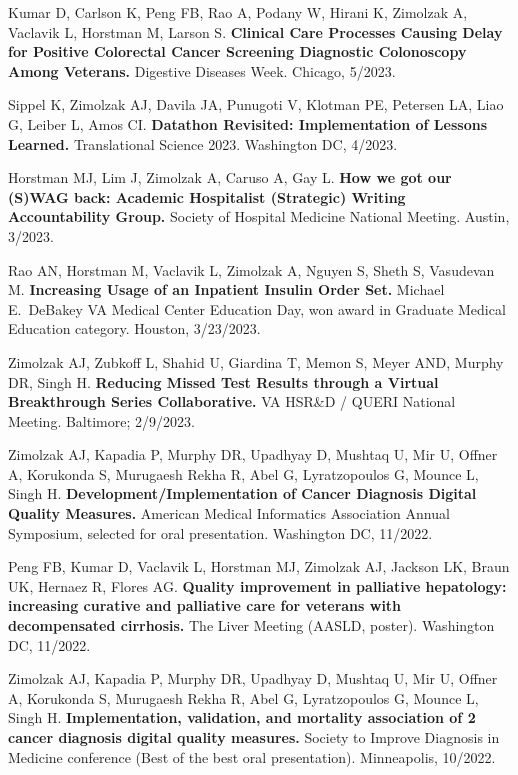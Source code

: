 \documentclass[10pt]{article}
\begin{document}
Kumar D, Carlson K, Peng FB, Rao A, Podany W, Hirani K, Zimolzak A,
Vaclavik L, Horstman M, Larson S. \textbf{Clinical Care Processes
  Causing Delay for Positive Colorectal Cancer Screening Diagnostic
  Colonoscopy Among Veterans.} Digestive Diseases Week. Chicago,
5/2023.

Sippel K, Zimolzak AJ, Davila JA, Punugoti V, Klotman PE, Petersen LA,
Liao G, Leiber L, Amos CI. \textbf{Datathon Revisited: Implementation
  of Lessons Learned.} Translational Science 2023. Washington DC,
4/2023.

Horstman MJ, Lim J, Zimolzak A, Caruso A, Gay L. \textbf{How we got
  our (S)WAG back: Academic Hospitalist (Strategic) Writing
  Accountability Group.} Society of Hospital Medicine National
Meeting. Austin, 3/2023.

Rao AN, Horstman M, Vaclavik L, Zimolzak A, Nguyen S, Sheth S,
Vasudevan M. \textbf{Increasing Usage of an Inpatient Insulin Order
  Set.} Michael E.\ DeBakey VA Medical Center Education Day, won award
in Graduate Medical Education category. Houston, 3/23/2023.

Zimolzak AJ, Zubkoff L, Shahid U, Giardina T, Memon S, Meyer AND,
Murphy DR, Singh H. \textbf{Reducing Missed Test Results through a
  Virtual Breakthrough Series Collaborative.} VA HSR\&D / QUERI
National Meeting. Baltimore; 2/9/2023.


Zimolzak AJ, Kapadia P, Murphy DR, Upadhyay D, Mushtaq U, Mir U,
Offner A, Korukonda S, Murugaesh Rekha R, Abel G, Lyratzopoulos G,
Mounce L, Singh H. \textbf{Development/Implementation of Cancer
  Diagnosis Digital Quality Measures.} American Medical Informatics
Association Annual Symposium, selected for oral presentation.
Washington DC, 11/2022.

Peng FB, Kumar D, Vaclavik L, Horstman MJ, Zimolzak AJ, Jackson LK,
Braun UK, Hernaez R, Flores AG. \textbf{Quality improvement in
  palliative hepatology: increasing curative and palliative care for
  veterans with decompensated cirrhosis.} The Liver Meeting (AASLD,
poster). Washington DC, 11/2022.

Zimolzak AJ, Kapadia P, Murphy DR, Upadhyay D, Mushtaq U, Mir U,
Offner A, Korukonda S, Murugaesh Rekha R, Abel G, Lyratzopoulos G,
Mounce L, Singh H. \textbf{Implementation, validation, and mortality
  association of 2 cancer diagnosis digital quality measures.} Society
to Improve Diagnosis in Medicine conference (Best of the best oral
presentation). Minneapolis, 10/2022.
\end{document}
